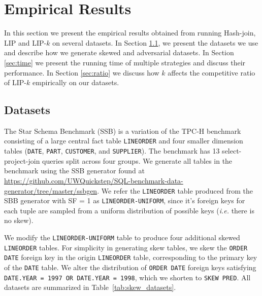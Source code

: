 \section{Empirical Results}\label{sec:experiment}

In this section we present the empirical results obtained from running Hash-join, LIP and LIP-$k$ on several datasets. In Section \ref{sec:dataset}, we present the datasets we use and describe how we generate skewed and adversarial datasets. In Section \ref{sec:time} we present the running time of multiple strategies and discuss their performance. In Section \ref{sec:ratio} we discuss how $k$ affects the competitive ratio of LIP-$k$ empirically on our datasets.

\subsection{Datasets}
\label{sec:dataset}

The Star Schema Benchmark (SSB) is a variation of the TPC-H benchmark 
consisting of a large central fact table \texttt{LINEORDER} and four smaller dimension tables (\texttt{DATE}, \texttt{PART}, \texttt{CUSTOMER}, and \texttt{SUPPLIER}).
The benchmark has 13 select-project-join queries split across four groups. 
We generate all tables in the benchmark using the SSB generator found at \url{https://github.com/UWQuickstep/SQL-benchmark-data-generator/tree/master/ssbgen}.
We refer the \texttt{LINEORDER} table produced from the SBB generator with SF = 1 as \texttt{LINEORDER-UNIFORM}, 
since it's foreign keys for each tuple are sampled from a uniform distribution of possible keys ({\it i.e.} there is no skew).

We modify the \texttt{LINEORDER-UNIFORM} table to produce four additional skewed \texttt{LINEORDER} tables.
For simplicity in generating skew tables, we skew the \texttt{ORDER DATE} foreign key in the origin \texttt{LINEORDER} table, corresponding to the primary key of the \texttt{DATE} table. 
We alter the distribution of \texttt{ORDER DATE} foreign keys satisfying \texttt{DATE.YEAR = 1997 OR DATE.YEAR = 1998}, which we shorten to \texttt{SKEW PRED}.
All datasets are summarized in Table~\ref{tab:skew_datasets}.


